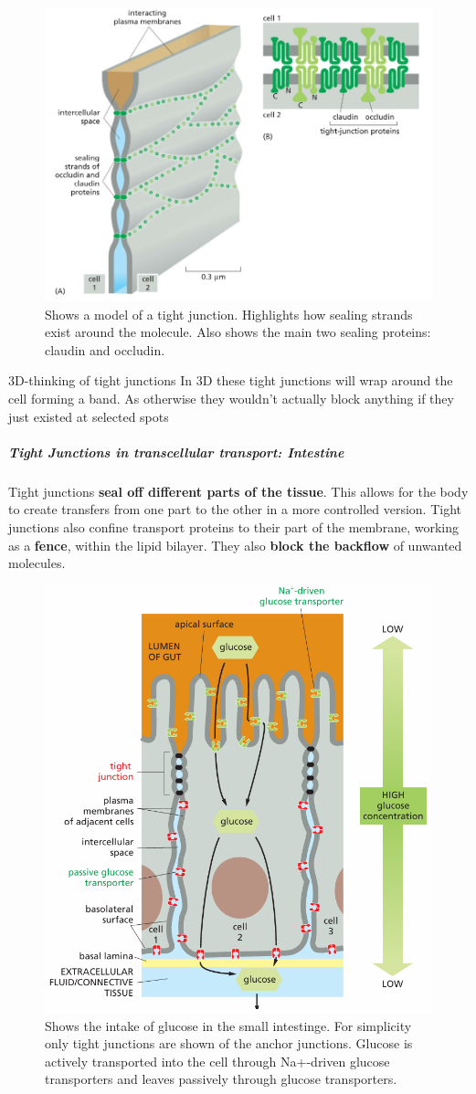 \documentclass[../main.tex]{subfiles}
\begin{document}
\begin{figure}[H]
	\centering
	\includegraphics[width=0.6\linewidth]{tight_over}
	\caption{Shows a model of a tight junction. Highlights how sealing strands exist around the molecule. Also shows the main two sealing proteins: claudin and occludin.}
	\label{fig:tightover}
\end{figure}


\begin{RemarkWithTitel}{3D-thinking of tight junctions}
	In 3D these tight junctions will wrap around the cell forming a band. As otherwise they wouldn't actually block anything if they just existed at selected spots
\end{RemarkWithTitel}

\subparagraph{Tight Junctions in transcellular transport: Intestine}

Tight junctions \textbf{seal off different parts of the tissue}. This allows for the body to create transfers from one part to the other in a more controlled version. Tight junctions also confine transport proteins to their part of the membrane, working as a \textbf{fence}, within the lipid bilayer. They also \textbf{block the backflow} of unwanted molecules.

\begin{figure}[H]
	\centering
	\includegraphics[width=0.6\linewidth]{tight_glu}
	\caption{Shows the intake of glucose in the small intestinge. For simplicity only tight junctions are shown of the anchor junctions. Glucose is actively transported into the cell through Na+-driven glucose transporters and leaves passively through glucose transporters.}
	\label{fig:tightglu}
\end{figure}
\end{document}
